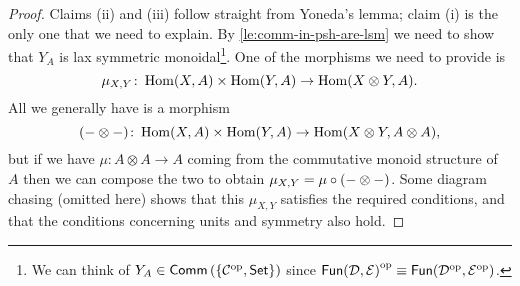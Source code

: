         \begin{proof}
            Claims (ii) and (iii) follow straight from Yoneda's lemma; claim (i) is the only one that we need to explain.
            By \cref{le:comm-in-psh-are-lsm} we need to show that $Y_A$ is lax symmetric monoidal\footnote{
                We can think of $Y_A\in\mathsf{Comm}\left({\{{\mathcal{C}}^{\mathrm{op}},\mathsf{Set}\}}\right)$ since ${\mathsf{Fun}(\mathcal{D},\mathcal{E})}^{\mathrm{op}}\equiv\mathsf{Fun}({\mathcal{D}}^{\mathrm{op}},{\mathcal{E}}^{\mathrm{op}})$.
            }.
            One of the morphisms we need to provide is
            \begin{equation*}
                \mu_{X,Y}\colon\operatorname{Hom}(X,A)\times\operatorname{Hom}(Y,A)\to\operatorname{Hom}(X\otimes Y,A).
            \end{equation*}
            All we generally have is a morphism
            \begin{equation*}
                ({-}\otimes{-})\colon\operatorname{Hom}(X,A)\times\operatorname{Hom}(Y,A)\to\operatorname{Hom}(X\otimes Y,A\otimes A),
            \end{equation*}
            but if we have $\mu\colon A\otimes A\to A$ coming from the commutative monoid structure of $A$ then we can compose the two to obtain $\mu_{X,Y}=\mu\circ({-}\otimes{-})$.
            Some diagram chasing (omitted here) shows that this $\mu_{X,Y}$ satisfies the required conditions, and that the conditions concerning units and symmetry also hold.
        \end{proof}

        

